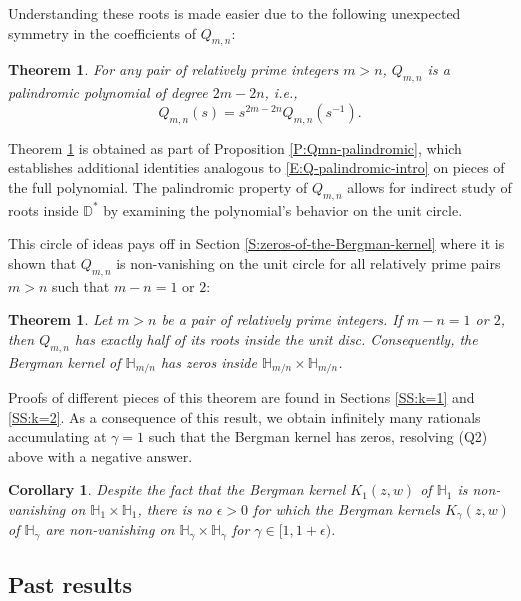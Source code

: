 \documentclass[letterpaper,11pt,reqno]{amsart}
\theoremstyle{plain}
\newtheorem{theorem}[equation]{Theorem}
\newtheorem{corollary}[equation]{Corollary}
\theoremstyle{definition}
\theoremstyle{remark}
\theoremstyle{remark}
\numberwithin{equation}{section}
\newcommand{\D}{{\mathbb D}}
\newcommand{\h}{{\mathbb H}}
\begin{document}
Understanding these roots is made easier due to the following unexpected symmetry in the coefficients of $Q_{m,n}$:

\begin{theorem}\label{T:Q-palindromic-intro}
For any pair of relatively prime integers $m>n$, $Q_{m,n}$ is a palindromic polynomial of degree $2m-2n$, i.e.,
\begin{equation}\label{E:Q-palindromic-intro}
Q_{m,n}(s) = s^{2m-2n} Q_{m,n}(s^{-1}).
\end{equation}
\end{theorem}
Theorem \ref{T:Q-palindromic-intro} is obtained as part of Proposition \ref{P:Qmn-palindromic}, which establishes additional identities analogous to \eqref{E:Q-palindromic-intro} on pieces of the full polynomial.
The palindromic property of $Q_{m,n}$ allows for indirect study of roots inside $\D^*$ by examining the polynomial's behavior on the unit circle.

This circle of ideas pays off in Section \ref{S:zeros-of-the-Bergman-kernel} where it is shown that
$Q_{m,n}$ is non-vanishing on the unit circle for all relatively prime pairs $m>n$ such that $m-n = 1$ or $2$:


\begin{theorem}\label{T:half-zeros-inside-intro}
Let $m>n$ be a pair of relatively prime integers.
If $m-n = 1$ or $2$, then $Q_{m,n}$ has exactly half of its roots inside the unit disc.
Consequently, the Bergman kernel of $\h_{m/n}$ has zeros inside $\h_{m/n} \times \h_{m/n}$.
\end{theorem}

Proofs of different pieces of this theorem are found in Sections \ref{SS:k=1} and \ref{SS:k=2}.
As a consequence of this result, we obtain infinitely many rationals accumulating at $\gamma = 1$ such that the Bergman kernel has zeros, resolving (Q2) above with a negative answer.

\begin{corollary}
Despite the fact that the Bergman kernel $K_1(z,w)$ of $\h_1$ is non-vanishing on $\h_1 \times \h_1$, there is no $\epsilon > 0$ for which the Bergman kernels $K_\gamma(z,w)$ of $\h_\gamma$ are non-vanishing on $\h_\gamma \times \h_\gamma$ for $\gamma \in [1,1+\epsilon)$.
\end{corollary}

\subsection{Past results}\label{SS:previous-results}
\end{document}
